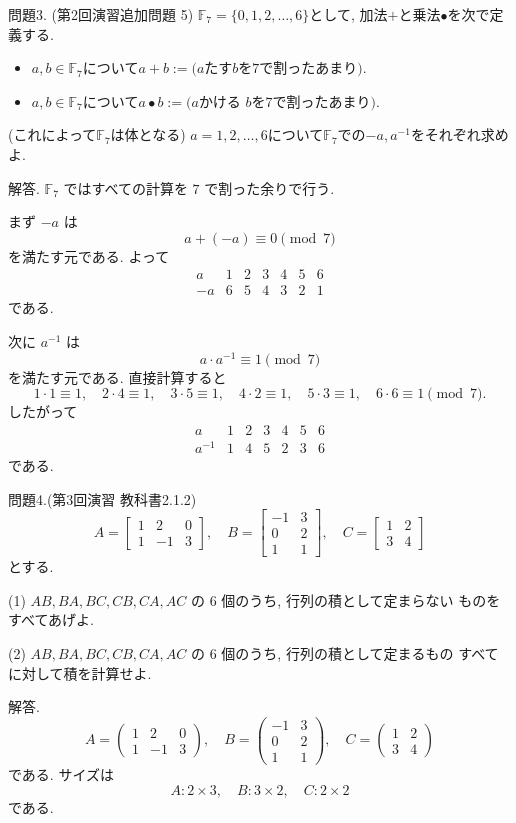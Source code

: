 \documentclass[dvipdfmx,a4paper,11pt]{article} %
\newcommand{\F}{\mathbb{F}}
\theoremstyle{definition}
\begin{document}
問題3. (第2回演習追加問題 5) $\mathbb{F}_7=\{0,1 ,2, \ldots, 6\}$として, 
  加法$+ $と乗法$\bullet$を次で定義する.
  \begin{itemize}
  \item $a, b \in \mathbb{F}_7$について$a+b:=\text{($a$たす$b$を$7$で割ったあまり)}$. 
\item $a, b \in \mathbb{F}_7$について$a\bullet b:=\text{($a$かける $b$を$7$で割ったあまり)}$. 
 \end{itemize}
(これによって$\mathbb{F}_7$は体となる)
$a=1,2, \ldots, 6$について$\mathbb{F}_7$での$-a, a^{-1}$をそれぞれ求めよ.

解答. 
$\F_7$ ではすべての計算を $7$ で割った余りで行う.

まず $-a$ は
\[
a+(-a)\equiv 0 \pmod 7
\]
を満たす元である. よって
\[
\begin{array}{c|cccccc}
a&1&2&3&4&5&6\\
\hline
-a&6&5&4&3&2&1
\end{array}
\]
である.

次に $a^{-1}$ は
\[
a\cdot a^{-1}\equiv 1 \pmod 7
\]
を満たす元である. 直接計算すると
\[
1\cdot1\equiv1,
\quad
2\cdot4\equiv1,
\quad
3\cdot5\equiv1,
\quad
4\cdot2\equiv1,
\quad
5\cdot3\equiv1,
\quad
6\cdot6\equiv1
\pmod 7.
\]
したがって
\[
\begin{array}{c|cccccc}
a&1&2&3&4&5&6\\
\hline
a^{-1}&1&4&5&2&3&6
\end{array}
\]
である.

問題4.(第3回演習 教科書2.1.2)
\[
A=
\begin{bmatrix}
1 & 2 & 0\\
1 & -1 & 3
\end{bmatrix},
\quad
B=
\begin{bmatrix}
-1 & 3\\
0 & 2\\
1 & 1
\end{bmatrix},
\quad
C=
\begin{bmatrix}
1 & 2\\
3 & 4
\end{bmatrix}
\]
とする.

(1) \(AB, BA, BC, CB, CA, AC\) の \(6\) 個のうち, 行列の積として定まらない
ものをすべてあげよ.

(2) \(AB, BA, BC, CB, CA, AC\) の \(6\) 個のうち, 行列の積として定まるもの
すべてに対して積を計算せよ.

解答.
\[
A=
\begin{pmatrix}
1&2&0\\
1&-1&3
\end{pmatrix},
\quad
B=
\begin{pmatrix}
-1&3\\
0&2\\
1&1
\end{pmatrix},
\quad
C=
\begin{pmatrix}
1&2\\
3&4
\end{pmatrix}
\]
である. サイズは
\[
A:2\times3,
\quad
B:3\times2,
\quad
C:2\times2
\]
である.
\end{document}
